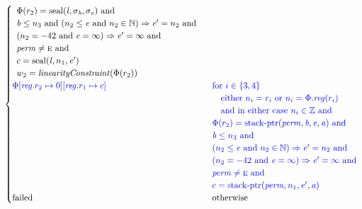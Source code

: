 \documentclass[a4paper]{article}
\newcommand{\tand}{\text{ and }}
\newcommand{\totherwise}{\text{otherwise }}
\newcommand{\sourcecolor}[1]{\color{blue}}
\newcommand{\src}[1]{{\sourcecolor{} #1}}
\newcommand{\nats}{\mathbb{N}}
\newcommand{\ints}{\mathbb{Z}}
\newcommand{\update}[2]{[#1 \mapsto #2]}
\newcommand{\updReg}[2]{\update{\reg.#1}{#2}}
\newcommand{\shareddom}[1]{\mathrm{#1}}
\newcommand{\perm}{\var{perm}}
\newcommand{\lin}{\var{l}}
\newcommand{\stkptr}[1]{\mathrm{stack\text{-}ptr}(#1)}
\newcommand{\seal}[1]{\shareddom{seal}(#1)}
\newcommand{\failed}{\mathrm{failed}}
\newcommand{\var}[1]{\mathit{#1}}
\newcommand{\reg}{\var{reg}}
\newcommand{\baddr}{\var{b}}
\newcommand{\eaddr}{\var{e}}
\newcommand{\aaddr}{\var{a}}
\newcommand{\plainperm}[1]{\textsc{#1}}
\newcommand{\enter}{\plainperm{e}}
\newcommand{\plainfun}[2]{
  \ifthenelse{\equal{#2}{}}
  {\mathit{#1}}
  {\mathit{#1}(#2)}
}
\newcommand{\linCons}[1]{\plainfun{linearityConstraint}{#1}}
\begin{document}
\begin{align*}
\begin{cases}
\begin{array}[t]{l}
                                                   \Phi(r_2) = \seal{\lin,\sigma_\baddr,\sigma_\eaddr} \tand \\
                                                   \baddr \leq n_3 \tand 
                                                   (n_2 \leq \eaddr \tand n_2 \in \nats) \Rightarrow \eaddr' = n_2 \tand \\
                                                   (n_2 = -42 \tand \eaddr = \infty) \Rightarrow \eaddr' = \infty \tand\\
                                                   \perm \neq \enter \tand\\
                                                   c = \seal{\lin,n_1,\eaddr'}\\
                                                   w_2 = \linCons{\Phi(r_2)}
                                                 \end{array}
\\
                                                 \src{\Phi\updReg{r_2}{0}\updReg{r_1}{c}} &
                                                 \arraycolsep=0pt
                                                 \begin{array}[t]{l}
                                                   \src{\text{for $i \in \{3, 4\}$ }} \\
                                                   \quad \src{\text{either $n_i = r_i$ or $n_i = \Phi.\reg(r_i)$}}\\
                                                   \quad \src{\text{and in either case $n_i \in \ints$ and}} \\
                                                   \src{\Phi(r_2) = \stkptr{\perm,\baddr,\eaddr,\aaddr} \tand} \\
                                                   \src{\baddr \leq n_3 \tand } \\
                                                   \src{(n_2 \leq \eaddr \tand n_2 \in \nats) \Rightarrow \eaddr' = n_2 \tand }\\
                                                   \src{(n_2 = -42 \tand \eaddr = \infty) \Rightarrow \eaddr' = \infty \tand}\\
                                                   \src{\perm \neq \enter \tand}\\
                                                   \src{c = \stkptr{\perm,n_1,\eaddr',\aaddr}}\\
                                                 \end{array}\\
                                                 \failed & \totherwise 
                                               \end{cases}
\end{align*}
\end{document}
